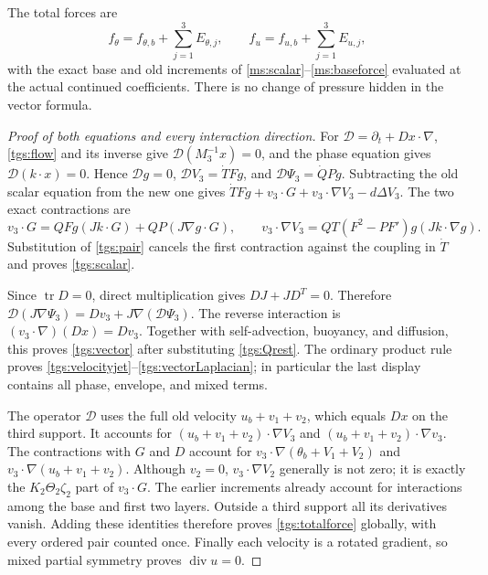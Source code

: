 The total forces are
\begin{equation}\label{tgs:totalforce}
 f_\theta=f_{\theta,b}+\sum_{j=1}^3E_{\theta,j},\qquad
 f_u=f_{u,b}+\sum_{j=1}^3E_{u,j},
\end{equation}
with the exact base and old increments of
\eqref{ms:scalar}--\eqref{ms:baseforce} evaluated at the actual
continued coefficients. There is no change of pressure hidden in
the vector formula.

\begin{proof}[Proof of both equations and every interaction direction]
For $\mathcal D=\partial_t+Dx\cdot\nabla$,
\eqref{tgs:flow} and its inverse give
$\mathcal D(M_3^{-1}x)=0$, and the phase equation gives
$\mathcal D(k\cdot x)=0$. Hence $\mathcal Dg=0$,
$\mathcal DV_3=\dot T Fg$, and $\mathcal D\Psi_3=\dot QPg$.
Subtracting the old scalar equation from the new one gives
$\dot T Fg+v_3\cdot G+v_3\cdot\nabla V_3-d\Delta V_3$.
The two exact contractions are
\[
 v_3\cdot G=QFg(Jk\cdot G)+QP(J\nabla g\cdot G),\qquad
 v_3\cdot\nabla V_3=QT(F^2-PF')g(Jk\cdot\nabla g).
\]
Substitution of \eqref{tgs:pair} cancels the first contraction
against the coupling in $\dot T$ and proves \eqref{tgs:scalar}.

Since $\operatorname{tr}D=0$, direct multiplication gives
$DJ+JD^T=0$. Therefore
$\mathcal D(J\nabla\Psi_3)=Dv_3+J\nabla(\mathcal D\Psi_3)$.
The reverse interaction is $(v_3\cdot\nabla)(Dx)=Dv_3$.
Together with self-advection, buoyancy, and diffusion, this proves
\eqref{tgs:vector} after substituting \eqref{tgs:Qrest}.
The ordinary product rule proves
\eqref{tgs:velocityjet}--\eqref{tgs:vectorLaplacian}; in particular
the last display contains all phase, envelope, and mixed terms.

The operator $\mathcal D$ uses the full old velocity $u_b+v_1+v_2$,
which equals $Dx$ on the third support. It accounts for
$(u_b+v_1+v_2)\cdot\nabla V_3$ and
$(u_b+v_1+v_2)\cdot\nabla v_3$.
The contractions with $G$ and $D$ account for
$v_3\cdot\nabla(\theta_b+V_1+V_2)$ and
$v_3\cdot\nabla(u_b+v_1+v_2)$.
Although $v_2=0$, $v_3\cdot\nabla V_2$ generally is not zero;
it is exactly the $K_2\Theta_2\zeta_2$ part of $v_3\cdot G$.
The earlier increments already account for interactions among
the base and first two layers. Outside a third support all its
derivatives vanish. Adding these identities therefore proves
\eqref{tgs:totalforce} globally, with every ordered pair counted
once. Finally each velocity is a rotated gradient, so mixed
partial symmetry proves $\operatorname{div}u=0$.
\end{proof}


